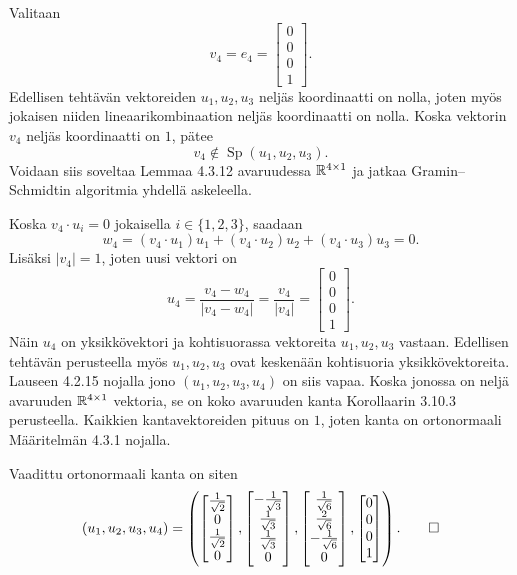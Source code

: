 \documentclass[11pt,a4paper]{amsart}
\begin{document}
\begin{solution}
  Valitaan
  \[
    v_4=e_4=
    \begin{bmatrix}0 \\ 0 \\ 0 \\ 1
    \end{bmatrix}.
  \]
  Edellisen tehtävän vektoreiden \(u_1,u_2,u_3\) neljäs koordinaatti
  on nolla, joten myös jokaisen niiden lineaarikombinaation neljäs
  koordinaatti on nolla. Koska vektorin \(v_4\) neljäs koordinaatti
  on \(1\), pätee
  \[
    v_4\notin\operatorname{Sp}(u_1,u_2,u_3).
  \]
  Voidaan siis soveltaa Lemmaa 4.3.12 avaruudessa \(\mathbb{R}^{4\times 1}\)
  ja jatkaa Gramin--Schmidtin algoritmia yhdellä askeleella.

  Koska \(v_4\cdot u_i=0\) jokaisella \(i\in\{1,2,3\}\), saadaan
  \[
    w_4=(v_4\cdot u_1)u_1+(v_4\cdot u_2)u_2+(v_4\cdot u_3)u_3=0.
  \]
  Lisäksi \(|v_4|=1\), joten uusi vektori on
  \[
    u_4=\frac{v_4-w_4}{|v_4-w_4|}
    =\frac{v_4}{|v_4|}
    =
    \begin{bmatrix}0 \\ 0 \\ 0 \\ 1
    \end{bmatrix}.
  \]
  Näin \(u_4\) on yksikkövektori ja kohtisuorassa vektoreita
  \(u_1,u_2,u_3\) vastaan. Edellisen tehtävän perusteella myös
  \(u_1,u_2,u_3\) ovat keskenään kohtisuoria yksikkövektoreita.
  Lauseen 4.2.15 nojalla jono \((u_1,u_2,u_3,u_4)\) on siis vapaa.
  Koska jonossa on neljä avaruuden \(\mathbb{R}^{4\times 1}\) vektoria,
  se on koko avaruuden kanta Korollaarin 3.10.3 perusteella.
  Kaikkien kantavektoreiden pituus on \(1\), joten kanta on
  ortonormaali Määritelmän 4.3.1 nojalla.

  Vaadittu ortonormaali kanta on siten
  \begingroup
  \renewcommand{\arraystretch}{1.35}
  \[
    (u_1,u_2,u_3,u_4)=
    \left(
      \begin{bmatrix}\frac1{\sqrt2} \\ 0 \\ \frac1{\sqrt2} \\ 0
      \end{bmatrix},
      \begin{bmatrix}-\frac1{\sqrt3} \\ \frac1{\sqrt3} \\ \frac1{\sqrt3} \\ 0
      \end{bmatrix},
      \begin{bmatrix}\frac1{\sqrt6} \\ \frac2{\sqrt6} \\ -\frac1{\sqrt6} \\ 0
      \end{bmatrix},
      \begin{bmatrix}0 \\ 0 \\ 0 \\ 1
      \end{bmatrix}
    \right).\qedhere
  \]
  \endgroup
\end{solution}
\end{document}
